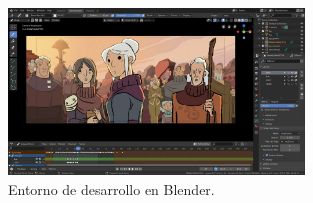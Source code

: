  \begin{figure}[H]
\leavevmode
\begin{minipage}{\textwidth}
\begin{center}
    \includegraphics[width=0.7\textwidth]{./capitulo_03/figures/SW/herojpg.jpg} %
    \caption{Entorno de desarrollo en Blender.}
    \label{fig:blender}
\end{center}
\end{minipage}
\end{figure}